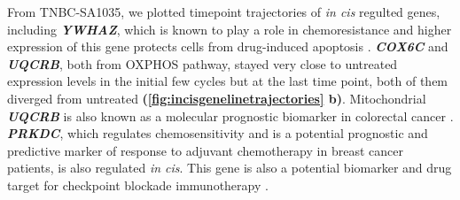 
From TNBC-SA1035, we plotted timepoint trajectories of \textit{in cis} regulted genes, including \textit{\textbf{YWHAZ}}, which is known to play a role in chemoresistance and higher expression of this gene protects cells from drug-induced apoptosis \cite{li2010amplification}.
\textit{\textbf{COX6C}} and \textit{\textbf{UQCRB}}, both from \ac{OXPHOS} pathway, stayed very close to untreated expression levels in the initial few cycles but at the last time point, both of them diverged from untreated \textbf{(\autoref{fig:incisgenelinetrajectories} b)}.
Mitochondrial \textit{\textbf{UQCRB}} is also known as a molecular prognostic biomarker in colorectal cancer \cite{kim2017mitochondrial}.
\textit{\textbf{PRKDC}}, which regulates chemosensitivity and is a potential prognostic and predictive marker of response to adjuvant chemotherapy in breast cancer patients, is also regulated \textit{in cis}. This gene is also a potential biomarker and drug target for checkpoint blockade immunotherapy \cite{tan2020prkdc, sun2017prkdc, zhang2019prkdc}.





